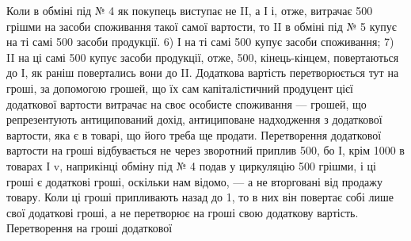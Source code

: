 Коли в обміні під № 4 як покупець виступає не II, а І і, отже, витрачає
500 грішми на засоби споживання такої самої вартости, то II
в обміні під № 5 купує на ті самі 500 засоби продукції.
6) І на ті самі 500 купує засоби споживання; 7) II на ці самі
500 купує засоби продукції, отже, 500, кінець-кінцем,
повертаються до І, як раніш повертались вони до II. Додаткова вартість
перетворюється тут на гроші, за допомогою грошей, що їх сам капіталістичний
продуцент цієї додаткової вартости витрачає на своє особисте
споживання — грошей, що репрезентують антиципований дохід, антициповане
надходження з додаткової вартости, яка є в товарі, що його треба
ще продати. Перетворення додаткової вартости на гроші відбувається не
через зворотний приплив 500, бо І, крім 1000
в товарах І v, наприкінці обміну під № 4 подав у циркуляцію 500 грішми, і ці гроші є додаткові гроші, оскільки нам відомо, — а не
вторговані від продажу товару. Коли ці гроші припливають назад до 1,
то в них він повертає собі лише свої додаткові гроші, а не перетворює
на гроші свою додаткову вартість. Перетворення на гроші додаткової
\parbreak{}  %
